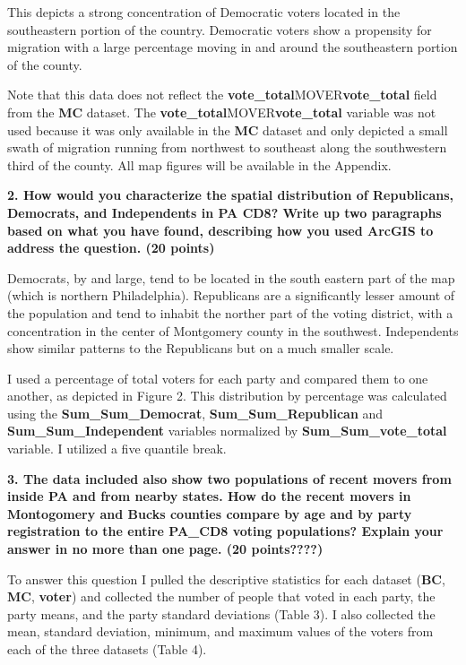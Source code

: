 \documentclass[12pt]{article}
\begin{document}
This depicts a strong concentration of Democratic voters located in the southeastern portion of the country.  Democratic voters show a propensity for migration with a large percentage moving in and around the southeastern portion of the county.  

Note that this data does not reflect the \textbf{vote\_total}MOVER\textbf{vote\_total} field from the \textbf{MC} dataset.  The \textbf{vote\_total}MOVER\textbf{vote\_total} variable was not used because it was only available in the \textbf{MC} dataset and only depicted a small swath of migration running from northwest to southeast along the southwestern third of the county.  All map figures will be available in the Appendix.



\noindent \textbf{2. How would you characterize the spatial distribution of Republicans, Democrats, and Independents in PA CD8?  Write up two paragraphs based on what you have found, describing how you used ArcGIS to address the question.  (20 points)}

Democrats, by and large, tend to be located in the south eastern part of the map (which is northern Philadelphia).  Republicans are a significantly lesser amount of the population and tend to inhabit the norther part of the voting district, with a concentration in the center of Montgomery county in the southwest.  Independents show similar patterns to the Republicans but on a much smaller scale.

I used a percentage of total voters for each party and compared them to one another, as depicted in Figure 2.  This distribution by percentage was calculated using the \textbf{Sum\_Sum\_Democrat}, \textbf{Sum\_Sum\_Republican} and \textbf{Sum\_Sum\_Independent} variables normalized by \textbf{Sum\_Sum\_vote\_total} variable.  I utilized a five quantile break.



\noindent \textbf{3.  The data included also show two populations of recent movers from inside PA and from nearby states.  How do the recent movers in Montogomery and Bucks counties compare by age and by party registration to the entire PA\_CD8 voting populations?  Explain your answer in no more than one page. (20 points????)}

To answer this question I pulled the descriptive statistics for each dataset (\textbf{BC}, \textbf{MC}, \textbf{voter}) and collected the number of people that voted in each party, the party means, and the party standard deviations (Table 3).  I also collected the mean, standard deviation, minimum, and maximum values of the voters from each of the three datasets (Table 4).
\end{document}
